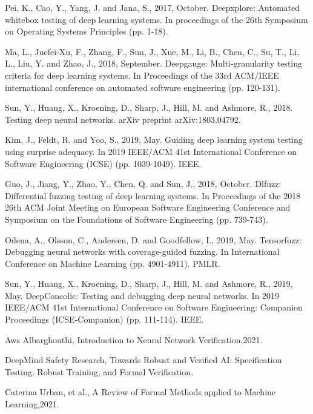 \begin{singlespace}
\begin{thebibliography}{}
   
    
     Pei, K., Cao, Y., Yang, J. and Jana, S., 2017, October. Deepxplore: Automated whitebox testing of deep learning systems. In proceedings of the 26th Symposium on Operating Systems Principles (pp. 1-18).

    Ma, L., Juefei-Xu, F., Zhang, F., Sun, J., Xue, M., Li, B., Chen, C., Su, T., Li, L., Liu, Y. and Zhao, J., 2018, September. Deepgauge: Multi-granularity testing criteria for deep learning systems. In Proceedings of the 33rd ACM/IEEE international conference on automated software engineering (pp. 120-131).
    
    Sun, Y., Huang, X., Kroening, D., Sharp, J., Hill, M. and Ashmore, R., 2018. Testing deep neural networks. arXiv preprint arXiv:1803.04792.

    Kim, J., Feldt, R. and Yoo, S., 2019, May. Guiding deep learning system testing using surprise adequacy. In 2019 IEEE/ACM 41st International Conference on Software Engineering (ICSE) (pp. 1039-1049). IEEE.
  
   
    Guo, J., Jiang, Y., Zhao, Y., Chen, Q. and Sun, J., 2018, October. Dlfuzz: Differential fuzzing testing of deep learning systems. In Proceedings of the 2018 26th ACM Joint Meeting on European Software Engineering Conference and Symposium on the Foundations of Software Engineering (pp. 739-743).

     Odena, A., Olsson, C., Andersen, D. and Goodfellow, I., 2019, May. Tensorfuzz: Debugging neural networks with coverage-guided fuzzing. In International Conference on Machine Learning (pp. 4901-4911). PMLR.

    Sun, Y., Huang, X., Kroening, D., Sharp, J., Hill, M. and Ashmore, R., 2019, May. DeepConcolic: Testing and debugging deep neural networks. In 2019 IEEE/ACM 41st International Conference on Software Engineering: Companion Proceedings (ICSE-Companion) (pp. 111-114). IEEE.


    Aws Albarghouthi, Introduction to Neural Network Verification,2021.
    
    DeepMind Safety Research, Towards Robust and Verified AI: Specification Testing, Robust Training, and Formal Verification.

    Caterina Urban, et al., A Review of Formal Methods applied to Machine Learning,2021.


\end{thebibliography}
\end{singlespace}
